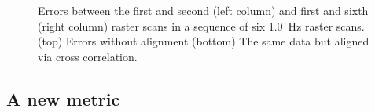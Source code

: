\documentclass[twocolumn,oneside]{IEEEtran/IEEEtran}
\begin{document}
\begin{figure}[t!]
  
  \caption{Errors between the first and second (left column) and first and sixth (right column) raster scans in a sequence of six 1.0~Hz raster scans. (top) Errors without alignment (bottom)
    The same data but aligned via cross correlation.}
  \label{fig:baseline_errors}
\end{figure}


\subsection{A new metric}
%   

\end{document}
